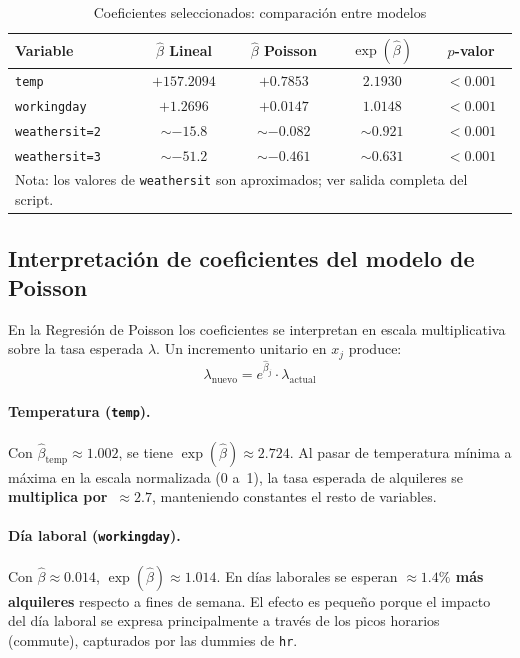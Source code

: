 \documentclass[12pt, a4paper]{article}
\begin{document}
	\begin{table}[H]
		\centering
		\caption{Coeficientes seleccionados: comparaci\'on entre modelos}
		\label{tab:coefs}
		\begin{tabular}{lcccc}
			\toprule
			\textbf{Variable} & \textbf{$\hat{\beta}$ Lineal} & \textbf{$\hat{\beta}$ Poisson}
			& \textbf{$\exp(\hat{\beta})$} & \textbf{$p$-valor} \\
			\midrule
			\texttt{temp}         & $+157.2094$ & $+0.7853$ & $2.1930$ & $<0.001$ \\
			\texttt{workingday}   & $+1.2696$   & $+0.0147$ & $1.0148$ & $<0.001$ \\
			\texttt{weathersit=2} & $\sim-15.8$ & $\sim-0.082$ & $\sim 0.921$ & $<0.001$ \\
			\texttt{weathersit=3} & $\sim-51.2$ & $\sim-0.461$ & $\sim 0.631$ & $<0.001$ \\
			\bottomrule
			\multicolumn{5}{l}{\footnotesize Nota: los valores de \texttt{weathersit} son aproximados;
				ver salida completa del script.}
		\end{tabular}
	\end{table}
	
	\subsection{Interpretaci\'on de coeficientes del modelo de Poisson}
	
	En la Regresi\'on de Poisson los coeficientes se interpretan en escala multiplicativa
	sobre la tasa esperada $\lambda$. Un incremento unitario en $x_j$ produce:
	\[
	\lambda_{\text{nuevo}} = e^{\hat{\beta}_j} \cdot \lambda_{\text{actual}}
	\]
	
	\paragraph{Temperatura (\texttt{temp}).}
	Con $\hat{\beta}_{\text{temp}} \approx 1.002$, se tiene
	$\exp(\hat{\beta}) \approx 2.724$. Al pasar de temperatura m\'inima a m\'axima en
	la escala normalizada (0 a~1), la tasa esperada de alquileres se
	\textbf{multiplica por~$\approx 2.7$}, manteniendo constantes el resto de variables.
	
	\paragraph{D\'ia laboral (\texttt{workingday}).}
	Con $\hat{\beta} \approx 0.014$, $\exp(\hat{\beta}) \approx 1.014$. En d\'ias
	laborales se esperan \textbf{$\approx 1.4\%$ m\'as alquileres} respecto a fines de
	semana. El efecto es peque\~no porque el impacto del d\'ia laboral se expresa
	principalmente a trav\'es de los picos horarios (commute), capturados por las
	dummies de \texttt{hr}.
	
\end{document}
